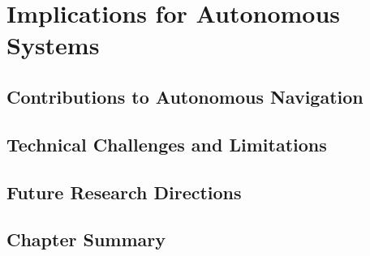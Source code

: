 \section{Implications for Autonomous Systems}

\subsection{Contributions to Autonomous Navigation}

\subsection{Technical Challenges and Limitations}

\subsection{Future Research Directions}

\subsection{Chapter Summary}


